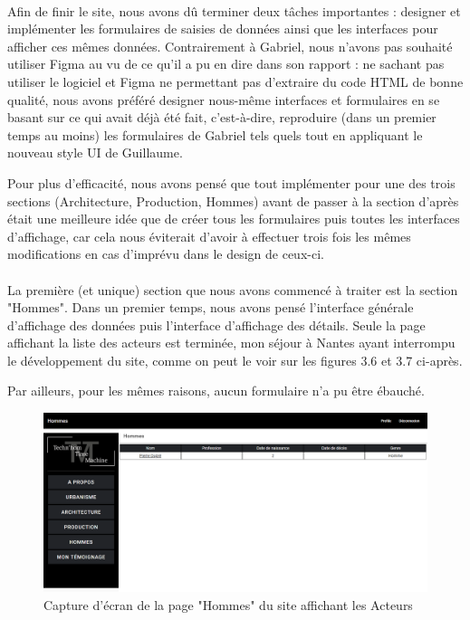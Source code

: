 \paragraph{} \hspace{10mm}
Afin de finir le site, nous avons dû terminer deux tâches importantes : designer et implémenter les formulaires de saisies de données ainsi que les interfaces pour afficher ces mêmes données. Contrairement à Gabriel, nous n'avons pas souhaité utiliser Figma au vu de ce qu'il a pu en dire dans son rapport : ne sachant pas utiliser le logiciel et Figma ne permettant pas d'extraire du code HTML de bonne qualité, nous avons préféré designer nous-même interfaces et formulaires en se basant sur ce qui avait déjà été fait, c'est-à-dire, reproduire (dans un premier temps au moins) les formulaires de Gabriel tels quels tout en appliquant le nouveau style UI de Guillaume.

Pour plus d'efficacité, nous avons pensé que tout implémenter pour une des trois sections (Architecture, Production, Hommes) avant de passer à la section d'après était une meilleure idée que de créer tous les formulaires puis toutes les interfaces d'affichage, car cela nous éviterait d'avoir à effectuer trois fois les mêmes modifications en cas d'imprévu dans le design de ceux-ci. 

\paragraph{} \hspace{10mm}
La première (et unique) section que nous avons commencé à traiter est la section "Hommes". Dans un premier temps, nous avons pensé l'interface générale d'affichage des données puis l'interface d'affichage des détails. Seule la page affichant la liste des acteurs est terminée, mon séjour à Nantes ayant interrompu le développement du site, comme on peut le voir sur les figures 3.6 et 3.7 ci-après.

Par ailleurs, pour les mêmes raisons, aucun formulaire n'a pu être ébauché.
\begin{figure} [H]
    \centering
    \includegraphics[width=1\textwidth]{assets/web/site/screen_liste_hommes.png}
    \caption{Capture d'écran de la page "Hommes" du site affichant les Acteurs}
    \label{fig:screenPageHommes}
\end{figure}

